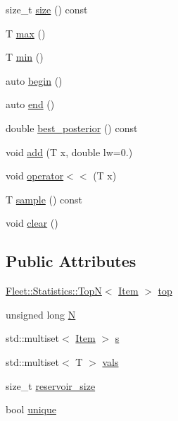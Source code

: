 \begin{DoxyCompactItemize}
\item 
size\+\_\+t \hyperlink{class_fleet_1_1_statistics_1_1_reservoir_sample_abdfad455c8b8da8cb2ab30d0f60053e0}{size} () const
\item 
T \hyperlink{class_fleet_1_1_statistics_1_1_reservoir_sample_af2d03d8d0e93ddedc61a43d1827ae48d}{max} ()
\item 
T \hyperlink{class_fleet_1_1_statistics_1_1_reservoir_sample_ab2f186b828351e164e1ed6e60c8c9be8}{min} ()
\item 
auto \hyperlink{class_fleet_1_1_statistics_1_1_reservoir_sample_af441a020b7a7244e9ca56c8d293fb59a}{begin} ()
\item 
auto \hyperlink{class_fleet_1_1_statistics_1_1_reservoir_sample_a4e3cf1195fcb255f2b0281d9307bfd16}{end} ()
\item 
double \hyperlink{class_fleet_1_1_statistics_1_1_reservoir_sample_aa802a85955db2941b99851f3b98e5252}{best\+\_\+posterior} () const
\item 
void \hyperlink{class_fleet_1_1_statistics_1_1_reservoir_sample_a374930296f502c957a925a5f7ba9087b}{add} (T x, double lw=0.)
\item 
void \hyperlink{class_fleet_1_1_statistics_1_1_reservoir_sample_ad6e4d50ef1acefce7f5d66013720c1ef}{operator$<$$<$} (T x)
\item 
T \hyperlink{class_fleet_1_1_statistics_1_1_reservoir_sample_a1b66a8f27512ebd6a48370621a43db87}{sample} () const
\item 
void \hyperlink{class_fleet_1_1_statistics_1_1_reservoir_sample_aadf45c574db6a4ab93da3df2b3f1df03}{clear} ()
\end{DoxyCompactItemize}
\subsection*{Public Attributes}
\begin{DoxyCompactItemize}
\item 
\hyperlink{class_fleet_1_1_statistics_1_1_top_n}{Fleet\+::\+Statistics\+::\+TopN}$<$ \hyperlink{class_fleet_1_1_statistics_1_1_reservoir_sample_1_1_item}{Item} $>$ \hyperlink{class_fleet_1_1_statistics_1_1_reservoir_sample_ae14c8d6d8d5d6f1e3854710cf60b7716}{top}
\item 
unsigned long \hyperlink{class_fleet_1_1_statistics_1_1_reservoir_sample_a1e0c5104f173107e23900ff707df05ab}{N}
\item 
std\+::multiset$<$ \hyperlink{class_fleet_1_1_statistics_1_1_reservoir_sample_1_1_item}{Item} $>$ \hyperlink{class_fleet_1_1_statistics_1_1_reservoir_sample_a7cf0266d882988e2a61b857d123c8b58}{s}
\item 
std\+::multiset$<$ T $>$ \hyperlink{class_fleet_1_1_statistics_1_1_reservoir_sample_a9ffdb177a62651a2280099553124c433}{vals}
\item 
size\+\_\+t \hyperlink{class_fleet_1_1_statistics_1_1_reservoir_sample_a94ccb7246b63257eeee446ab4574387a}{reservoir\+\_\+size}
\item 
bool \hyperlink{class_fleet_1_1_statistics_1_1_reservoir_sample_ae3376d7008fd736ff141fa811aad4b65}{unique}
\end{DoxyCompactItemize}


